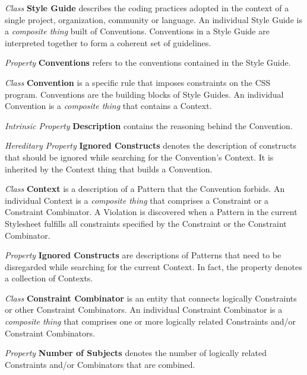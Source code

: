 \begin{description}

\item\textit{Class} \textbf{Style Guide} describes the coding practices
adopted  in the context of a single project, organization, community or
language. An individual Style Guide is a \textit{composite thing} built of
Conventions. Conventions in a Style Guide are interpreted
together to form a coherent set of guidelines.

\textit{Property} \textbf{Conventions} refers to the conventions contained in the Style Guide.


\item\textit{Class} \textbf{Convention} is a specific rule that imposes constraints on the CSS program. Conventions are the building blocks of Style Guides. An individual Convention is a \textit{composite thing} that contains a Context.

\textit{Intrinsic Property} \textbf{Description} contains the reasoning behind the Convention.

\textit{Hereditary Property} \textbf{Ignored Constructs} denotes the description of constructs that should be ignored while searching for the Convention's Context. It is inherited by the Context thing that builds a Convention.


\item\textit{Class} \textbf{Context} is a description of a Pattern that the Convention forbids. An individual Context is a \textit{composite thing} that comprises a Constraint or a Constraint Combinator. A Violation is discovered when a Pattern in the current Stylesheet fulfills all constraints specified by the Constraint or the Constraint Combinator.

\textit{Property} \textbf{Ignored Constructs} are descriptions of Patterns that need to be disregarded while searching for the current Context. In fact, the property denotes a collection of Contexts.






\item\textit{Class} \textbf{Constraint Combinator} is an entity that connects logically Constraints or other Constraint Combinators. An individual Constraint Combinator is a \textit{composite thing} that comprises one or more logically related Constraints and/or Constraint Combinators.

\textit{Property} \textbf{Number of Subjects} denotes the number of logically related Constraints and/or Combinators that are combined.


\end{description}
